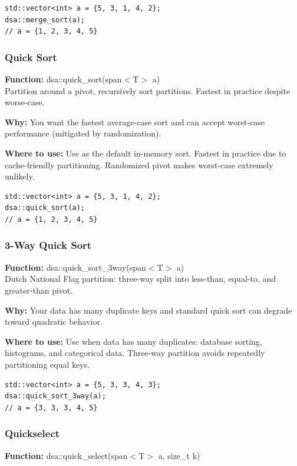 \documentclass[11pt]{article}
\begin{document}
\begin{lstlisting}
std::vector<int> a = {5, 3, 1, 4, 2};
dsa::merge_sort(a);
// a = {1, 2, 3, 4, 5}
\end{lstlisting}

\subsubsection{Quick Sort}
\textbf{Function:} dsa::quick\_sort(span$<$T$>$ a)\\

Partition around a pivot, recursively sort partitions. Fastest in practice despite worse-case.

\textbf{Why:} You want the fastest average-case sort and can accept worst-case performance (mitigated by randomization). \par \textbf{Where to use:} Use as the default in-memory sort. Fastest in practice due to cache-friendly partitioning. Randomized pivot makes worst-case extremely unlikely.

\begin{lstlisting}
std::vector<int> a = {5, 3, 1, 4, 2};
dsa::quick_sort(a);
// a = {1, 2, 3, 4, 5}
\end{lstlisting}

\subsubsection{3-Way Quick Sort}
\textbf{Function:} dsa::quick\_sort\_3way(span$<$T$>$ a)\\

Dutch National Flag partition: three-way split into less-than, equal-to, and greater-than pivot.

\textbf{Why:} Your data has many duplicate keys and standard quick sort can degrade toward quadratic behavior. \par \textbf{Where to use:} Use when data has many duplicates: database sorting, histograms, and categorical data. Three-way partition avoids repeatedly partitioning equal keys.

\begin{lstlisting}
std::vector<int> a = {5, 3, 3, 4, 3};
dsa::quick_sort_3way(a);
// a = {3, 3, 3, 4, 5}
\end{lstlisting}

\subsubsection{Quickselect}
\textbf{Function:} dsa::quick\_select(span$<$T$>$ a, size\_t k)\\
\end{document}
